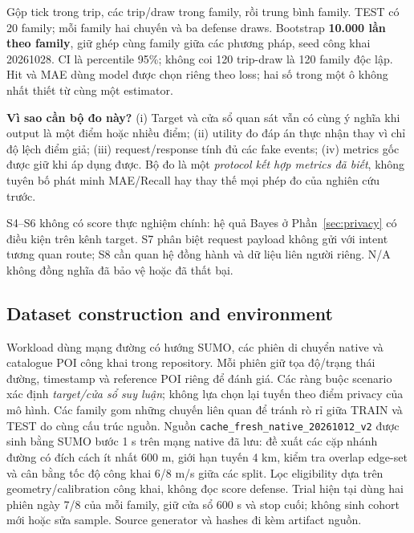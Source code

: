 Gộp tick trong trip, các trip/draw trong family, rồi trung bình family. TEST có 20 family; mỗi family hai
chuyến và ba defense draws. Bootstrap \textbf{10.000 lần theo family}, giữ ghép cùng family giữa các phương pháp,
seed công khai 20261028. CI là percentile 95\%; không coi 120 trip-draw là 120 family độc lập.
Hit và MAE dùng model được chọn riêng theo loss; hai số trong một ô không nhất thiết từ cùng một estimator.

\textbf{Vì sao cần bộ đo này?} (i) Target và cửa sổ quan sát vẫn có cùng ý nghĩa khi output là một điểm hoặc
nhiều điểm; (ii) utility đo đáp án thực nhận thay vì chỉ độ lệch điểm giả; (iii) request/response tính đủ các
fake events; (iv) metrics gốc được giữ khi áp dụng được. Bộ đo là một \emph{protocol kết hợp metrics đã biết},
không tuyên bố phát minh MAE/Recall hay thay thế mọi phép đo của nghiên cứu trước.

S4--S6 không có score thực nghiệm chính: hệ quả Bayes ở Phần~\ref{sec:privacy} có điều kiện trên kênh target.
S7 phân biệt request payload không gửi với intent tương quan route; S8 cần quan hệ đồng hành và dữ liệu
liên người riêng. N/A không đồng nghĩa đã bảo vệ hoặc đã thất bại.

\clearpage
\subsection{Dataset construction and environment}
Workload dùng mạng đường có hướng SUMO, các phiên di chuyển native và catalogue POI công khai trong
repository. Mỗi phiên giữ tọa độ/trạng thái đường, timestamp và reference POI riêng để đánh giá. Các ràng buộc
scenario xác định \emph{target/cửa sổ suy luận}; không lựa chọn lại tuyến theo điểm privacy của mô hình.
Các family gom những chuyến liên quan để tránh rò rỉ giữa TRAIN và TEST do cùng cấu trúc nguồn.
Nguồn \texttt{cache\_fresh\_native\_20261012\_v2} được sinh bằng SUMO bước 1 s trên mạng native đã lưu:
đề xuất các cặp nhánh đường có đích cách ít nhất 600 m, giới hạn tuyến 4 km, kiểm tra overlap edge-set
và cân bằng tốc độ công khai 6/8 m/s giữa các split. Lọc eligibility dựa trên geometry/calibration công khai,
không đọc score defense. Trial hiện tại dùng hai phiên ngày 7/8 của mỗi family, giữ cửa sổ 600 s và stop cuối;
không sinh cohort mới hoặc sửa sample. Source generator và hashes đi kèm artifact nguồn.

